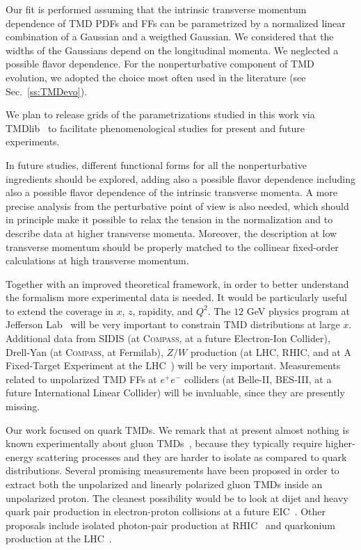 \documentclass[aps,preprintnumbers,showpacs,nofootinbib,superscriptaddress,floatfix]{revtex4}
\newcommand{\compass}{\textsc{Compass}}
\begin{document}
Our fit is performed assuming that the intrinsic transverse momentum
dependence of TMD PDFs and FFs 
can be parametrized by a normalized linear combination of a Gaussian and a
weigthed Gaussian. We considered that the widths of the Gaussians depend on the longitudinal
momenta. We neglected a possible flavor dependence. 
For the nonperturbative component of TMD evolution, we adopted the choice most
often used in the literature (see Sec.~\ref{ss:TMDevo}). 

We plan to release grids of the parametrizations studied in this work via
TMDlib~\cite{Hautmann:2014kza} to facilitate phenomenological studies for
present and future experiments. 

In future studies, different
functional forms for all the nonperturbative ingredients should be explored, 
adding also a possible
flavor dependence 
including also a possible
flavor dependence of the intrinsic transverse momenta.
A more
precise analysis from the perturbative point of view is also needed, which
should in principle make it possible to relax the tension in the normalization and to describe data at higher transverse
momenta. Moreover, the description at low transverse momentum  
should be properly matched to 
the collinear fixed-order calculations at high transverse momentum. 

Together with an improved theoretical framework, in order to better understand
the formalism more experimental data is needed. It would be particularly
useful to extend the
coverage in $x$, $z$, rapidity, and $Q^2$.  
The $12$ GeV physics program at Jefferson Lab~\cite{Dudek:2012vr} will be very important to constrain TMD distributions at large $x$.
Additional data from SIDIS (at \compass, at a future Electron-Ion
Collider), Drell-Yan (at \compass, at Fermilab), 
$Z/W$ production (at LHC, RHIC, and at
A Fixed-Target Experiment at the LHC~\cite{Brodsky:2012vg}) 
will be very important. Measurements
related to unpolarized
TMD FFs at $e^+e^-$ colliders (at Belle-II, BES-III, at a
future International Linear Collider) will be invaluable, since they are
presently missing.

Our work focused on quark TMDs.
We remark that at present almost nothing is known experimentally about gluon
TMDs~\cite{Mulders:2000sh,Echevarria:2015uaa}, because they typically require
higher-energy scattering processes and they are harder to isolate as compared
to quark distributions. Several promising measurements have been proposed in
order to extract both the unpolarized and linearly polarized gluon TMDs inside
an unpolarized proton. The cleanest possibility would be to look at dijet and
heavy quark pair production in electron-proton collisions at a future
EIC~\cite{Boer:2010zf,Pisano:2013cya}. Other proposals include isolated
photon-pair production at RHIC~\cite{Qiu:2011ai} and quarkonium production at
the LHC~\cite{Boer:2012bt,Dunnen:2014eta,Signori:2016jwo,Lansberg:2017tlc}.   
\end{document}
